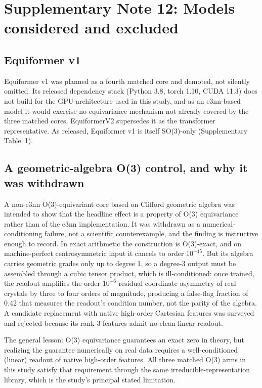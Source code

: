 \section*{Supplementary Note 12: Models considered and excluded}

\subsection*{Equiformer v1}

Equiformer v1 was planned as a fourth matched core and demoted, not silently omitted. Its released dependency stack (Python 3.8, torch 1.10, CUDA 11.3) does not build for the GPU architecture used in this study, and as an e3nn-based model it would exercise no equivariance mechanism not already covered by the three matched cores. EquiformerV2 supersedes it as the transformer representative. As released, Equiformer v1 is itself SO(3)-only (Supplementary Table~1).

\subsection*{A geometric-algebra O(3) control, and why it was withdrawn}

A non-e3nn O(3)-equivariant core based on Clifford geometric algebra\cite{polat2026cliffordstf} was intended to show that the headline effect is a property of O(3) equivariance rather than of the e3nn implementation. It was withdrawn as a numerical-conditioning failure, not a scientific counterexample, and the finding is instructive enough to record. In exact arithmetic the construction is O(3)-exact, and on machine-perfect centrosymmetric input it cancels to order $10^{-15}$. But its algebra carries geometric grades only up to degree 1, so a degree-3 output must be assembled through a cubic tensor product, which is ill-conditioned: once trained, the readout amplifies the order-$10^{-6}$ residual coordinate asymmetry of real crystals by three to four orders of magnitude, producing a false-flag fraction of 0.42 that measures the readout's condition number, not the parity of the algebra. A candidate replacement with native high-order Cartesian features was surveyed and rejected because its rank-3 features admit no clean linear readout.

The general lesson: O(3) equivariance guarantees an exact zero in theory, but realizing the guarantee numerically on real data requires a well-conditioned (linear) readout of native high-order features. All three matched O(3) arms in this study satisfy that requirement through the same irreducible-representation library, which is the study's principal stated limitation.

